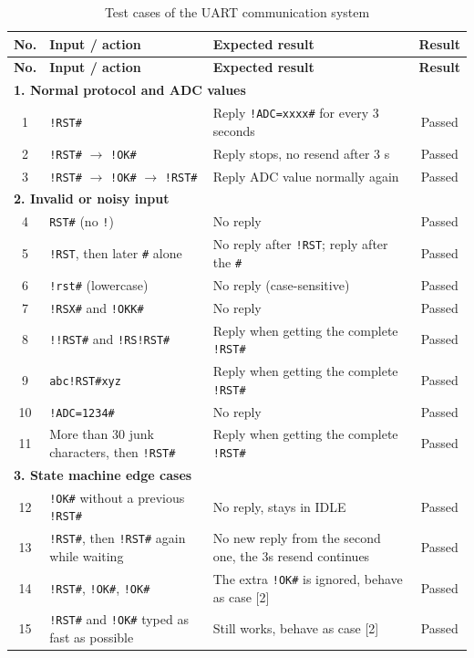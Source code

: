 \begin{longtable}{|c|p{4.3cm}|p{6.2cm}|c|}
        \caption{Test cases of the UART communication system}\\
        \hline
        \textbf{No.} & \textbf{Input / action} & \textbf{Expected result} & \textbf{Result} \\
        \hline
        \endfirsthead
        \hline
        \textbf{No.} & \textbf{Input / action} & \textbf{Expected result} & \textbf{Result} \\
        \hline
    \endhead

    \multicolumn{4}{|l|}{\textbf{1. Normal protocol and ADC values}} \\
    \hline
    1 & \texttt{!RST\#} & Reply \texttt{!ADC=xxxx\#} for every 3 seconds & Passed \\
    \hline
    2 & \texttt{!RST\#} $\to$ \texttt{!OK\#} & Reply stops, no resend after 3 s & Passed \\
    \hline
    3 & \texttt{!RST\#} $\to$ \texttt{!OK\#} $\to$ \texttt{!RST\#} & Reply ADC value normally again & Passed \\
    \hline

    \multicolumn{4}{|l|}{\textbf{2. Invalid or noisy input}} \\
    \hline
    4 & \texttt{RST\#} (no \texttt{!}) & No reply & Passed \\
    \hline
    5 & \texttt{!RST}, then later \texttt{\#} alone & No reply after \texttt{!RST}; reply after the \texttt{\#} & Passed \\
    \hline
    6 & \texttt{!rst\#} (lowercase) & No reply (case-sensitive) & Passed \\
    \hline
    7 & \texttt{!RSX\#} and \texttt{!OKK\#} & No reply & Passed \\
    \hline
    8 & \texttt{!!RST\#} and \texttt{!RS!RST\#} & Reply when getting the complete \texttt{!RST\#} & Passed \\
    \hline
    9 & \texttt{abc!RST\#xyz} & Reply when getting the complete \texttt{!RST\#} & Passed \\
    \hline
    10 & \texttt{!ADC=1234\#} & No reply & Passed \\
    \hline
    11 & More than 30 junk characters, then \texttt{!RST\#} & Reply when getting the complete \texttt{!RST\#} & Passed \\
    \hline

    \multicolumn{4}{|l|}{\textbf{3. State machine edge cases}} \\
    \hline
    12 & \texttt{!OK\#} without a previous \texttt{!RST\#} & No reply, stays in IDLE & Passed \\
    \hline
    13 & \texttt{!RST\#}, then \texttt{!RST\#} again while waiting & No new reply from the second one, the 3s resend continues & Passed \\
    \hline
    14 & \texttt{!RST\#}, \texttt{!OK\#}, \texttt{!OK\#} & The extra \texttt{!OK\#} is ignored, behave as case [2] & Passed \\
    \hline
    15 & \texttt{!RST\#} and \texttt{!OK\#} typed as fast as possible & Still works, behave as case [2] & Passed \\ \hline
\end{longtable}
